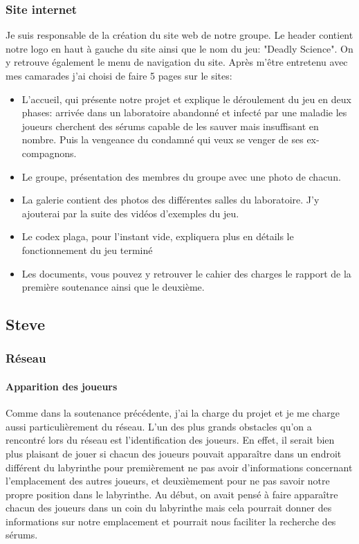 \documentclass{article}
\begin{document}
\subsubsection{Site internet}
Je suis responsable de la création du site web de notre groupe. Le header contient notre logo en haut à gauche du site ainsi que le nom du jeu: "Deadly Science". On y retrouve également le menu de navigation du site. Après m'être entretenu avec mes camarades j'ai choisi de faire 5 pages sur le sites:

\begin{itemize}
    \item L'accueil, qui présente notre projet et explique le déroulement du jeu en deux phases: arrivée dans un laboratoire abandonné et infecté par une maladie les joueurs cherchent des sérums capable de les sauver mais insuffisant en nombre. Puis la vengeance du condamné qui veux se venger de ses ex-compagnons.
    \item Le groupe, présentation des membres du groupe avec une photo de chacun.
    \item La galerie contient des photos des différentes salles du laboratoire. J'y ajouterai par la suite des vidéos d'exemples du jeu.
    \item Le codex plaga, pour l'instant vide, expliquera plus en détails le fonctionnement du jeu terminé
    \item Les documents, vous pouvez y retrouver le cahier des charges le rapport de la première soutenance ainsi que le deuxième.
\end{itemize}{}

\newpage
\subsection{Steve}

\subsubsection{Réseau}
\paragraph{Apparition des joueurs}

Comme dans la soutenance précédente, j’ai la charge du projet et je me charge aussi particulièrement du réseau. L'un des plus grands obstacles qu'on a rencontré lors du réseau est l'identification des joueurs. En effet, il serait bien plus plaisant de jouer si chacun des joueurs pouvait apparaître dans un endroit différent du labyrinthe pour premièrement ne pas avoir d'informations concernant l'emplacement des autres joueurs, et deuxièmement pour ne pas savoir notre propre position dans le labyrinthe. Au début, on avait pensé à faire apparaître chacun des joueurs dans un coin du labyrinthe mais cela pourrait donner des informations sur notre emplacement et pourrait nous faciliter la recherche des sérums.
\end{document}
